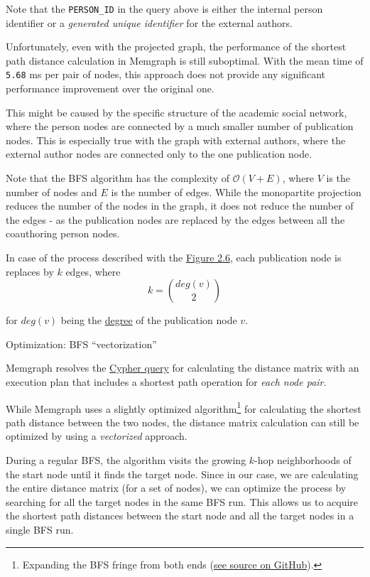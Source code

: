 Note that the \texttt{PERSON\_ID} in the query above is either the internal person identifier or a \textit{generated unique identifier} for the external authors.

Unfortunately, even with the projected graph, the performance of the shortest path distance calculation in Memgraph is still suboptimal. 
With the mean time of \texttt{5.68} ms per pair of nodes, this approach does not provide any significant performance improvement over the original one.

This might be caused by the specific structure of the academic social network, where the person nodes are connected by a much smaller number of publication nodes.
This is especially true with the graph with external authors, where the external author nodes are connected only to the one publication node.

Note that the BFS algorithm has the complexity of $\mathcal{O}(V + E)$, where $V$ is the number of nodes and $E$ is the number of edges.
While the monopartite projection reduces the number of the nodes in the graph, it does not reduce the number of the edges - as the publication nodes are replaced 
by the edges between all the coauthoring person nodes. 

In case of the process described with the \hyperref[fig:monopartite-projection]{Figure 2.6}, each publication node is replaces 
by $k$ edges, where 
$$
k = \binom{deg(v)}{2}
$$

for $deg(v)$ being the \hyperref[def:node-degree]{degree} of the publication node $v$.

\begin{mybox}
    {Optimization: BFS ``vectorization''}

    Memgraph resolves the \hyperref[fig:distance-matrix-calculation]{Cypher query} for calculating the distance matrix
    with an execution plan that includes a shortest path operation for \textit{each node pair}.

    While Memgraph uses a slightly optimized algorithm\footnote{Expanding the BFS fringe from both ends (\href{https://github.com/memgraph/memgraph/blob/58c3902c194e80a027d141788bd1afd07def0114/src/query/plan/operator.cpp\#L1569-L1572}{see source on GitHub}).} for calculating the shortest path distance between the two nodes,    
    the distance matrix calculation can still be optimized by using a \textit{vectorized} approach.

    During a regular BFS, the algorithm visits the growing $k$-hop neighborhoods of the start node until it finds the target node.
    Since in our case, we are calculating the entire distance matrix (for a set of nodes), 
    we can optimize the process by searching for all the target nodes in the same BFS run.
    This allows us to acquire the shortest path distances between the start node and all 
    the target nodes in a single BFS run.

\end{mybox}

